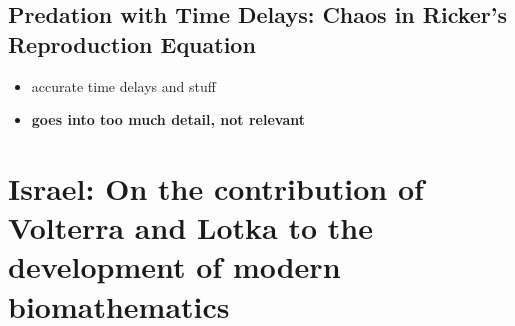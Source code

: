 \documentclass[a4paper,reqno,11pt]{article}
\begin{document}
\subsection{Predation with Time Delays: Chaos in Ricker's Reproduction
Equation}

\begin{itemize}
    \item accurate time delays and stuff
    \item \textbf{goes into too much detail, not relevant}
\end{itemize}


\section{Israel: On the contribution of Volterra and Lotka to the development
of modern biomathematics}
\end{document}
